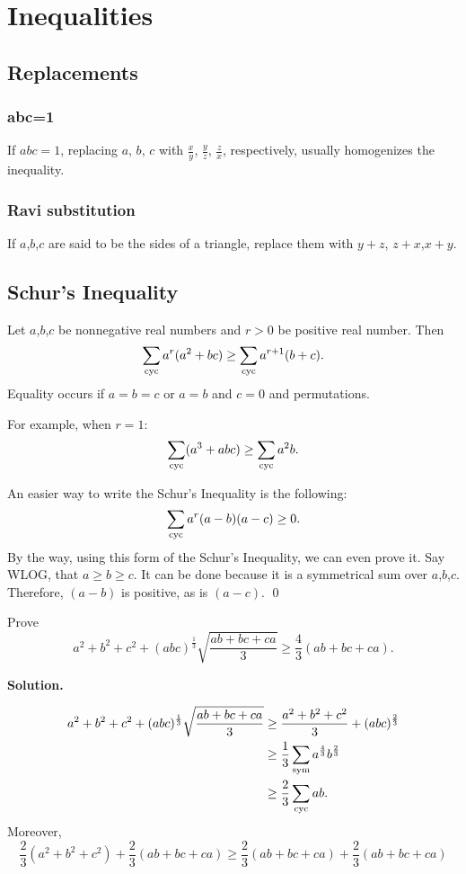 \section{\textsf{Inequalities}}
\subsection{\textsf{Replacements}}
\subsubsection{abc=1}
If $abc=1$, replacing $a$, $b$, $c$ with $\frac{x}{y}$, $\frac{y}{z}$,
$\frac{z}{x}$, respectively, usually homogenizes the inequality.
\subsubsection{Ravi substitution}
If $a$,$b$,$c$ are said to be the sides of a triangle, replace them with
$y+z$, $z+x$,$x+y$.

\clearpage

\subsection{\textsf{Schur's Inequality}}
Let $a$,$b$,$c$ be nonnegative real numbers and $r>0$ be positive real
number. Then
\[
	\sum_{\text{cyc}} a^r(a^2+bc) \ge \sum_{\text{cyc}} a^{r+1}(b+c).
\]
Equality occurs if $a=b=c$ or $a=b$ and $c=0$ and permutations.

For example, when $r=1$:
\[
	\sum_{\text{cyc}} (a^3+abc) \ge \sum_{\text{cyc}} a^2b.
\]

An easier way to write the Schur's Inequality is the following:
\[
	\sum_{\text{cyc}} a^r(a-b)(a-c) \ge 0.
\]
By the way, using this form of the Schur's Inequality, we can even prove it.
Say WLOG, that $a \ge b \ge c$. It can be done because it is a symmetrical
sum over $a$,$b$,$c$. Therefore, $(a-b)$ is positive, as is $(a-c)$. \qed

\begin{example}{}{}
	Prove
	\[
		a^2+b^2+c^2+(abc)^{\frac{1}{3}}\sqrt{\frac{ab+bc+ca}{3}} \ge \frac{4}
		{3}(ab+bc+ca).
	\]
\end{example}

\textbf{\textcolor{color2}{Solution.}}

\begin{align*}
	a^2+b^2+c^2+(abc)^{\frac{1}{3}}\sqrt{\frac{ab+bc+ca}{3}} & \ge \frac{a^2+b^2+c^2}{3} + (abc)^{\frac{2}{3}} \\ & \ge
	\frac{1}{3} \sum_{\text{sym}} a^{\frac{4}{3}}b^{\frac{2}{3}}                                                            \\ & \ge
	\frac{2}{3} \sum_{\text{cyc}} ab.
\end{align*}
Moreover,
\[
	\frac{2}{3}(a^2+b^2+c^2) + \frac{2}{3}(ab+bc+ca) \ge \frac{2}{3}(ab+bc+ca) + \frac{2}{3}(ab+bc+ca)
\]


